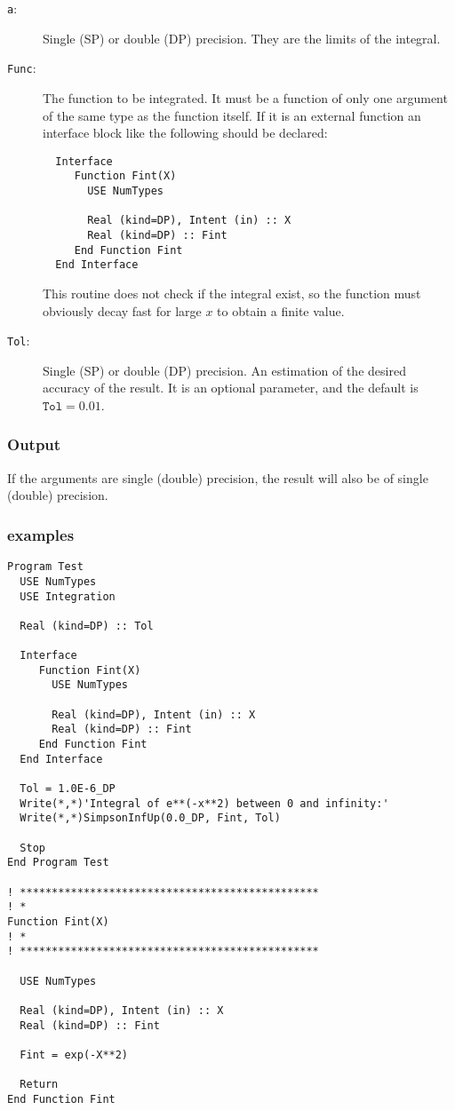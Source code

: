 \begin{description}
\item[\texttt{a}:] Single (SP) or double (DP) precision. They are
  the limits of the integral.
\item[\texttt{Func}:] The function to be integrated. It must be a
  function of only one argument of the same type as the function
  itself. If it is an
  external function an interface block like the following should be
  declared: 
\begin{verbatim}
  Interface 
     Function Fint(X)
       USE NumTypes

       Real (kind=DP), Intent (in) :: X
       Real (kind=DP) :: Fint
     End Function Fint
  End Interface
\end{verbatim}
  This routine does not check if the integral exist, so the function
  must obviously decay fast for large $x$ to obtain a finite value.
\item[\texttt{Tol}:] Single (SP) or double (DP) precision. An
  estimation of the desired accuracy of the result. It is an optional
  parameter, and the default is $\mathtt{Tol} = 0.01$. 
\end{description}


\subsubsection{Output}

If the arguments are single (double) precision, the result will also be of
single (double) precision. 


\subsubsection{examples}

\begin{verbatim}
Program Test
  USE NumTypes
  USE Integration

  Real (kind=DP) :: Tol

  Interface 
     Function Fint(X)
       USE NumTypes

       Real (kind=DP), Intent (in) :: X
       Real (kind=DP) :: Fint
     End Function Fint
  End Interface

  Tol = 1.0E-6_DP
  Write(*,*)'Integral of e**(-x**2) between 0 and infinity:'
  Write(*,*)SimpsonInfUp(0.0_DP, Fint, Tol)

  Stop
End Program Test

! ***********************************************
! *
Function Fint(X)
! *  
! ***********************************************

  USE NumTypes

  Real (kind=DP), Intent (in) :: X
  Real (kind=DP) :: Fint

  Fint = exp(-X**2)

  Return
End Function Fint
\end{verbatim}


